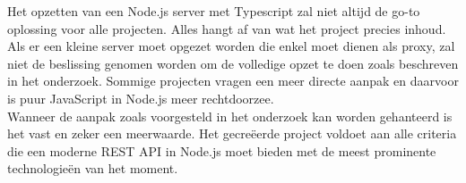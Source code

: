 Het opzetten van een Node.js server met Typescript zal niet altijd de go-to oplossing voor alle projecten. Alles hangt af van wat het project precies inhoud. Als er een kleine server moet opgezet worden die enkel moet dienen als proxy, zal niet de beslissing genomen worden om de volledige opzet te doen zoals beschreven in het onderzoek. Sommige projecten vragen een meer directe aanpak en daarvoor is puur JavaScript in Node.js meer rechtdoorzee. \\
Wanneer de aanpak zoals voorgesteld in het onderzoek kan worden gehanteerd is het vast en zeker een meerwaarde. Het gecreëerde project voldoet aan alle criteria die een moderne REST API in Node.js moet bieden met de meest prominente technologieën van het moment.


